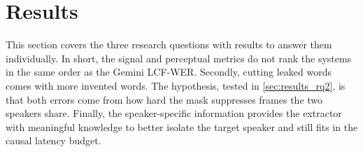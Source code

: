 \section{Results}
\label{sec:results}
This section covers the three research questions with results to answer them individually. In short, the signal and perceptual metrics do not rank the systems in the same order as the Gemini LCF-WER. Secondly, cutting leaked words comes with more invented words. The hypothesis, tested in \autoref{sec:results_rq2}, is that both errors come from how hard the mask suppresses frames the two speakers share. Finally, the speaker-specific information provides the extractor with meaningful knowledge to better isolate the target speaker and still fits in the causal latency budget. 
